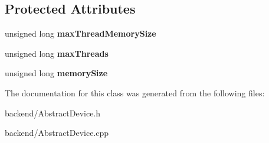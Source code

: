 \subsection*{Protected Attributes}
\begin{DoxyCompactItemize}
\item 
\mbox{\label{classathena_1_1backend_1_1_abstract_device_ac7851210f55e2f709b4ccbd23d9d3f76}} 
unsigned long {\bfseries max\+Thread\+Memory\+Size}
\item 
\mbox{\label{classathena_1_1backend_1_1_abstract_device_ade6690f678a25a634104dca162def5f9}} 
unsigned long {\bfseries max\+Threads}
\item 
\mbox{\label{classathena_1_1backend_1_1_abstract_device_af689d59af9dbf67df30275ab087b006a}} 
unsigned long {\bfseries memory\+Size}
\end{DoxyCompactItemize}


The documentation for this class was generated from the following files\+:\begin{DoxyCompactItemize}
\item 
backend/Abstract\+Device.\+h\item 
backend/Abstract\+Device.\+cpp\end{DoxyCompactItemize}
